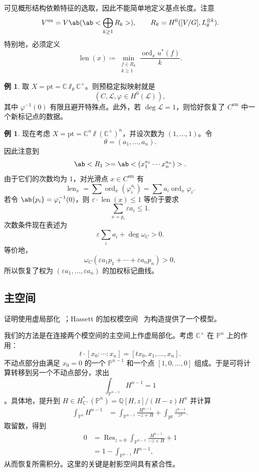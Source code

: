 \documentclass{amsart}
\theoremstyle{definition}
\newtheorem{exm}[thm]{例}
\theoremstyle{remark}
\theoremstyle{plain}
\theoremstyle{definition}
\theoremstyle{remark}
\newcommand{\C}{\mathbb{C}}
\newcommand{\Q}{\mathbb{Q}}
\renewcommand{\P}{\mathbb{P}}
\newcommand{\ep}{\varepsilon}
\newcommand{\mc}[1]{\mathcal{#1}}
\newcommand{\mr}[1]{\mathrm{#1}}
\newcommand{\on}[1]{\operatorname{#1}}
\newcommand{\1}{\mathbf{1}}
\newcommand{\2}{\mathbf{2}}
\newcommand{\3}{\mathbf{3}}
\begin{document}
可见概形结构依赖特征的选取，因此不能简单地定义基点长度。注意
\[ V^{\on{un}} = V\ab(\ab< \bigoplus_{k \geq 1} R_k>), \qquad R_k = H^0([V/G], L_{\theta}^{\otimes k}). \]
特别地，必须定义
\[ \on{len}(x) \coloneqq \min_{\substack{f \in R_k \\ k \geq 1}} \frac{\on{ord}_x u^*(f)}{k}. \]

\begin{exm}
    取 \(X = \mr{pt} = \C \sslash_{\theta} \C^{\times}\)。则预稳定拟映射就是
    \[ (C, \mc{L}, \varphi \in H^0(\mc{L})), \]
    其中 \(\varphi^{-1}(0)\) 有限且避开特殊点。此外，若 \(\deg \mc{L} = 1\)，则恰好恢复了 \(C^{\mr{sm}}\) 中一个新标记点的数据。
\end{exm}

\begin{exm}
    现在考虑 \(X = \mr{pt} = \C^n \sslash (\C^{\times})^n\)，并设次数为 \((1, \ldots, 1)\)。令
    \[ \theta = (a_1, \ldots, a_n). \]
    因此注意到
    \[ \ab<R_1> = \ab<(x_1^{a_1} \cdots x_n^{a_n})>. \]
    由于它们的次数均为 \(1\)，对光滑点 \(x \in C^{\mr{sm}}\) 有
    \[ \on{len}_x = \sum \on{ord}_x (\varphi_i^{a_i}) = \sum a_i \on{ord}_x \varphi_i. \]
    若令 \(\ab\{p_i\} = \varphi_i^{-1}(0)\)，则 \(\ep \cdot \on{len}(x) \leq 1\) 等价于要求
    \[ \sum_{x = p_i} \ep a_i \leq 1. \]
    次数条件现在表述为
    \[ \ep \sum_i a_i + \deg \omega_C > 0. \]
    等价地，
    \[ \omega_C(\ep a_1 p_1 + \cdots + \ep a_n p_n) > 0, \]
    所以恢复了权为 \((\ep a_1, \ldots, \ep a_n)\) 的加权标记曲线。
\end{exm}

\subsection{主空间}%
\label{sub:Master space}

证明使用虚局部化~\cite{GP1999}；Hassett 的加权模空间~\cite{Hassett2003} 为构造提供了一个模型。

我们的方法是在连接两个模空间的主空间上作虚局部化。考虑 \(\C^{\times}\) 在 \(\P^n\) 上的作用：
\[ t \cdot [x_0 : \cdots : x_n] = [t x_0, x_1, \ldots, x_n]. \]
不动点部分由满足 \(x_0 = 0\) 的一个 \(\P^{n-1}\) 和一个点 \([1, 0, \ldots, 0]\) 组成。于是可将计算转移到另一个不动点部分，求出
\[ \int_{\P^{n-1}} H^{n-1} = 1 \]
。具体地，提升到 \(H \in H_{\C^{\times}}^* (\P^n) = \Q[H,z] / (H-z)H^n\) 并计算
\begin{align*}
    \int_{\P^n} H^{n-1} &= \int_{\P^{n-1}} \frac{H^{n-1}}{-z+H} + \int_{\mr{pt}} \frac{z^{n-1}}{z^n}.
\end{align*}
取留数，得到
\begin{align*}
    0 &= \on{Res}_{z = 0}\int_{\P^{n-1}} \frac{H^{n-1}}{-z+H} + 1 \\
    &= 1 - \int_{\P^{n-1}}H^{n-1},
\end{align*}
从而恢复所需积分。这里的关键是射影空间具有紧合性。
\end{document}
